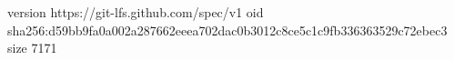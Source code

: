 version https://git-lfs.github.com/spec/v1
oid sha256:d59bb9fa0a002a287662eeea702dac0b3012c8ce5c1c9fb336363529c72ebec3
size 7171
